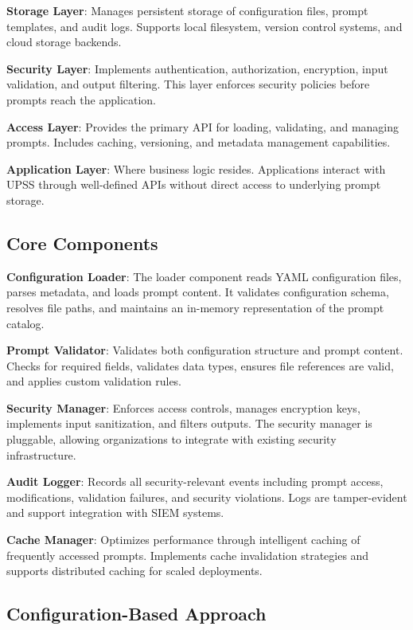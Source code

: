 \textbf{Storage Layer}: Manages persistent storage of configuration files, prompt templates, and audit logs. Supports local filesystem, version control systems, and cloud storage backends.

\textbf{Security Layer}: Implements authentication, authorization, encryption, input validation, and output filtering. This layer enforces security policies before prompts reach the application.

\textbf{Access Layer}: Provides the primary API for loading, validating, and managing prompts. Includes caching, versioning, and metadata management capabilities.

\textbf{Application Layer}: Where business logic resides. Applications interact with UPSS through well-defined APIs without direct access to underlying prompt storage.

\subsection{Core Components}

\textbf{Configuration Loader}: The loader component reads YAML configuration files, parses metadata, and loads prompt content. It validates configuration schema, resolves file paths, and maintains an in-memory representation of the prompt catalog.

\textbf{Prompt Validator}: Validates both configuration structure and prompt content. Checks for required fields, validates data types, ensures file references are valid, and applies custom validation rules.

\textbf{Security Manager}: Enforces access controls, manages encryption keys, implements input sanitization, and filters outputs. The security manager is pluggable, allowing organizations to integrate with existing security infrastructure.

\textbf{Audit Logger}: Records all security-relevant events including prompt access, modifications, validation failures, and security violations. Logs are tamper-evident and support integration with SIEM systems.

\textbf{Cache Manager}: Optimizes performance through intelligent caching of frequently accessed prompts. Implements cache invalidation strategies and supports distributed caching for scaled deployments.

\subsection{Configuration-Based Approach}

